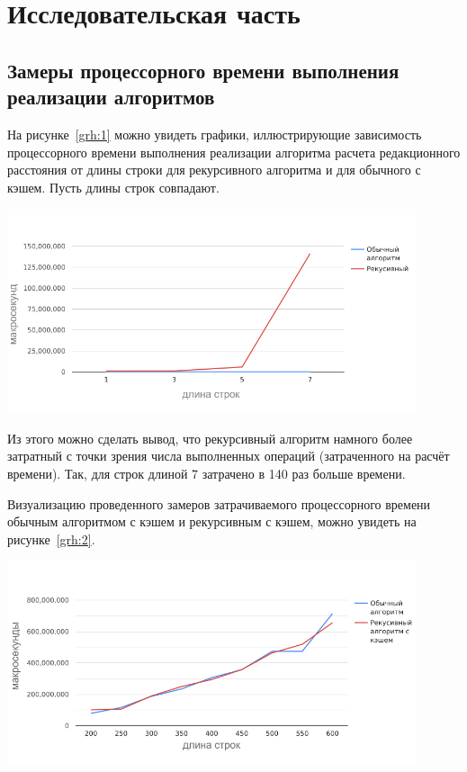 \documentclass[14pt]{article}
\begin{document}
\newpage
\section{Исследовательская часть}
\subsection{Замеры процессорного времени выполнения реализации алгоритмов}
На рисунке~\ref{grh:1} можно увидеть графики, иллюстрирующие зависимость процессорного времени выполнения реализации алгоритма расчета редакционного расстояния от длины строки для рекурсивного алгоритма и для обычного с кэшем. Пусть длины строк совпадают.

\begin{center}
\includegraphics[width = 0.9\textwidth]{chart_1}
\label{grh:1}
\end{center}

Из этого можно сделать вывод, что рекурсивный алгоритм намного более затратный с точки зрения числа выполненных операций (затраченного на расчёт времени). Так, для строк длиной 7 затрачено в 140 раз больше времени. \par %
\newpage

Визуализацию проведенного замеров затрачиваемого процессорного времени обычным алгоритмом с кэшем и рекурсивным с кэшем, можно увидеть на рисунке~\ref{grh:2}.\par

\begin{center}
\includegraphics[width=0.9\textwidth]{chart_2}
\label{grh:2}
\end{center}
\end{document}
